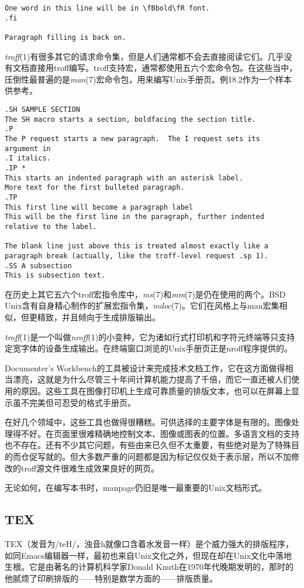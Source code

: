 \documentclass[12pt,oneside]{book}
\begin{document}
\begin{common-format}
\begin{Verbatim}[label=例18.1  groff(1)标记实例]
One word in this line will be in \fBbold\fR font.
.fi

Paragraph filling is back on.
\end{Verbatim}


\textit{troff}(1)有很多其它的请求命令集，但是人们通常都不会去直接阅读它们。几乎没有文档直接用troff编写。troff支持宏，通常都使用五六个宏命令包。在这些当中，压倒性最普遍的是\textit{man}(7)宏命令包，用来编写Unix手册页。例18.2作为一个样本供参考。
\begin{Verbatim}[label=例18.2 man标记实例]
.SH SAMPLE SECTION
The SH macro starts a section, boldfacing the section title.  
.P
The P request starts a new paragraph.  The I request sets its 
argument in
.I italics.
.IP *
This starts an indented paragraph with an asterisk label.
More text for the first bulleted paragraph.
.TP
This first line will become a paragraph label
This will be the first line in the paragraph, further indented
relative to the label.

The blank line just above this is treated almost exactly like a
paragraph break (actually, like the troff-level request .sp 1).
.SS A subsection
This is subsection text. 
\end{Verbatim}

在历史上其它五六个troff宏指令库中，\textit{ms}(7)和\textit{mm}(7)是仍在使用的两个。BSD Unix含有自身精心制作的扩展宏指令集，\textit{mdoc}(7)。它们在风格上与man宏集相似，但更精致，并且倾向于生成排版输出。

\textit{troff}(1)是一个叫做\textit{nroff}(1)的小变种，它为诸如行式打印机和字符元终端等只支持定宽字体的设备生成输出。在终端窗口浏览的Unix手册页正是nroff程序提供的。

Documenter's Workbench的工具被设计来完成技术文档工作，它在这方面做得相当漂亮，这就是为什么尽管三十年间计算机能力提高了千倍，而它一直还被人们使用的原因。这些工具在图像打印机上生成可靠质量的排版文本，也可以在屏幕上显示虽不完美但可忍受的格式手册页。

在好几个领域中，这些工具也做得很糟糕。可供选择的主要字体是有限的。图像处理得不好。在页面里很难精确地控制文本、图像或图表的位置。多语言文档的支持也不存在。还有不少其它问题，有些由来已久但不太重要，有些绝对是为了特殊目的而仓促写就的。但大多数严重的问题都是因为标记仅仅处于表示层，所以不加修改的troff源文件很难生成效果良好的网页。

无论如何，在编写本书时，manpage仍旧是唯一最重要的Unix文档形式。

\subsection{TEX}
TEX（发音为/teH/，浊音h就像口含着水发音一样）是个威力强大的排版程序，如同Emacs编辑器一样，最初也来自Unix文化之外，但现在却在Unix文化中落地生根。它是由著名的计算机科学家Donald Knuth在1970年代晚期发明的，那时的他腻烦了印刷排版的——特别是数学方面的——排版质量。


\end{common-format}
\end{document}
